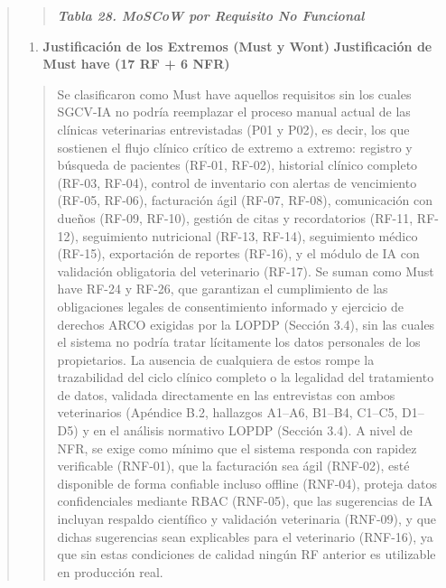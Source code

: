 \documentclass[
]{article}
\begin{document}
\begin{quote}
\begin{quote}
\protect{}\label{_bookmark106}{}\emph{\textbf{Tabla 28.
MoSCoW por Requisito No Funcional}}
\end{quote}

\begin{enumerate}
\def\labelenumi{\arabic{enumi}.}
\setcounter{enumi}{4}
\item
  \protect{}\label{_bookmark107}{}\textbf{Justificación de
  los Extremos (Must y Won\textquotesingle t)}
  \protect{}\label{_bookmark108}{}\textbf{Justificación de
  Must have (17 RF + 6 NFR)}
\end{enumerate}

\begin{quote}
Se clasificaron como Must have aquellos requisitos sin los cuales
SGCV-IA no podría reemplazar el proceso manual actual de las clínicas
veterinarias entrevistadas (P01 y P02), es decir, los que
sostienen el flujo clínico crítico de extremo a extremo: registro y
búsqueda de pacientes (RF-01, RF-02), historial clínico completo (RF-03,
RF-04), control de inventario con alertas de vencimiento (RF-05, RF-06),
facturación ágil (RF-07, RF-08), comunicación con dueños (RF-09, RF-10),
gestión de citas y recordatorios (RF-11, RF-12), seguimiento nutricional
(RF-13, RF-14), seguimiento médico (RF-15), exportación de reportes
(RF-16), y el módulo de IA con validación obligatoria del veterinario
(RF-17). Se suman como Must have RF-24 y RF-26, que garantizan el
cumplimiento de las obligaciones legales de consentimiento informado y
ejercicio de derechos ARCO exigidas por la LOPDP (Sección 3.4), sin las
cuales el sistema no podría tratar lícitamente los datos personales de
los propietarios. La ausencia de cualquiera de estos rompe la
trazabilidad del ciclo clínico completo o la legalidad del tratamiento
de datos, validada directamente en las entrevistas con ambos
veterinarios (Apéndice B.2, hallazgos A1--A6, B1--B4, C1--C5, D1--D5) y
en el análisis normativo LOPDP (Sección 3.4). A nivel de NFR, se exige
como mínimo que el sistema responda con rapidez verificable (RNF-01),
que la facturación sea ágil (RNF-02), esté disponible de forma confiable
incluso offline (RNF-04), proteja datos confidenciales mediante RBAC
(RNF-05), que las sugerencias de IA incluyan respaldo científico y
validación veterinaria (RNF-09), y que dichas sugerencias sean
explicables para el veterinario (RNF-16), ya que sin estas condiciones
de calidad ningún RF anterior es utilizable en producción real.
\end{quote}


\end{quote}
\end{document}
